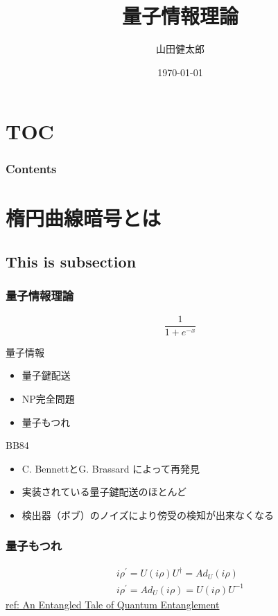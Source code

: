 \documentclass[dvipdfmx]{beamer}
\title[タイトル]{量子情報理論}
\author{山田健太郎}
\institute[JPN]{XX大学}
\date{\today}
\begin{document}
\begin{frame}\frametitle{}
\titlepage %
\end{frame}

\section*{TOC}
\begin{frame}\frametitle{Contents}
\tableofcontents %
\end{frame}

\section{楕円曲線暗号とは}
\subsection{This is subsection}
\begin{frame}\frametitle{量子情報理論}
$$
\frac{1}{1+e^{-x}}
$$

\begin{block}{量子情報}
    \begin{itemize}
         \item 量子鍵配送
         \item NP完全問題
         \item 量子もつれ
    \end{itemize}
\end{block}

\begin{alertblock}{BB84}
    \begin{itemize}
         \item C. BennettとG. Brassard によって再発見
         \item 実装されている量子鍵配送のほとんど
         \item 検出器（ボブ）のノイズにより傍受の検知が出来なくなる
    \end{itemize}
\end{alertblock}
\end{frame}

\begin{frame}\frametitle{量子もつれ}
\centering
\begin{eqnarray}
i\rho^{\prime}=U\left(  i\rho\right)  U^{\dagger}=Ad_{U}\left(  i\rho\right)\\
i\rho^{\prime}=Ad_{U}\left(  i\rho\right)  =U\left(  i\rho\right)  U^{-1}%
\end{eqnarray}
\vspace{16pt}
\href{http://www.csee.umbc.edu/~lomonaco/ams/lecturenotes/figssamtangle/unusedfigs/samtangle.tex}{ref: An Entangled Tale of Quantum Entanglement}
\end{frame}
\end{document}
